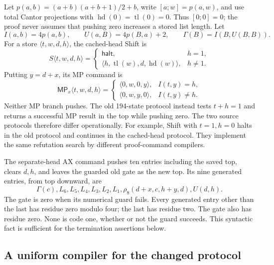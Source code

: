 Let $p(a,b)=(a+b)(a+b+1)/2+b$, write $[a;w]=p(a,w)$, and use total
Cantor projections with $\operatorname{hd}(0)=\operatorname{tl}(0)=0$.
Thus $[0;0]=0$; the proof never assumes that pushing zero increases a
stored list length. Let
\[
 I(a,b)=4p(a,b),\qquad U(a,B)=4p(B,a)+2,
 \qquad\Gamma(B)=I(B,U(B,B)).
\]
For a store $\langle t,w,d,h\rangle$, the cached-head Shift is
\[
 S\langle t,w,d,h\rangle=
 \begin{cases}
 \mathsf{halt},&h=1,\\
 \langle h,\operatorname{tl}(w),d,\operatorname{hd}(w)\rangle,&h\ne1.
 \end{cases}
\]
Putting $y=d+x$, its MP command is
\[
 \mathsf{MP}_x\langle t,w,d,h\rangle=
 \begin{cases}
 \langle0,w,0,y\rangle,&I(t,y)=h,\\
 \langle0,w,y,0\rangle,&I(t,y)\ne h.
 \end{cases}
\]
Neither MP branch pushes. The old 194-state protocol instead tests
$t+h=1$ and returns a successful MP result in the top while pushing
zero. The two source protocols therefore differ operationally. For
example, Shift with $t=1,h=0$ halts in the old protocol and continues
in the cached-head protocol. They implement the same refutation search
by different proof-command compilers.

The separate-head AX command pushes ten entries including the saved top,
clears $d,h$, and leaves the guarded old gate as the new top. Its nine
generated entries, from top downward, are
\[
 \Gamma(c),L_6,L_5,L_4,L_3,L_2,L_1,
 \rho_8(d+x,c,h+y,d),U(d,h).
\]
The gate is zero when its numerical guard fails. Every generated entry
other than the last has residue zero modulo four; the last has residue
two. The gate also has residue zero. None is code one, whether or not the
guard succeeds. This syntactic fact is sufficient for the termination
assertions below.

\subsection{A uniform compiler for the changed protocol}

